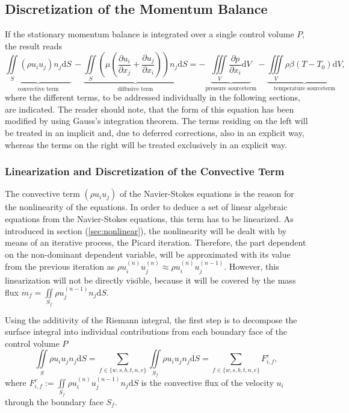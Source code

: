 \subsection{Discretization of the Momentum Balance}
\label{sec:segdiscretization}

If the stationary momentum balance is integrated over a single control volume \(P\), the result reads
\begin{equation}
  \label{eq:semidiscrete}
  \underbrace{\iint\limits_S (\rho u_i u_j)n_j \mathrm{d}S}_{\text{convective term}}
  \,- \underbrace{\iint\limits_S \left(\mu \left( \frac{\partial u_i}{\partial x_j} + \frac{\partial u_j}{\partial x_i}\right)\right)n_j \mathrm{d}S}_{\text{diffusive term}}
  = - \underbrace{\iiint\limits_V \frac{\partial p}{\partial x_i} \mathrm{d}V}_{\text{pressure sourceterm}}
  - \underbrace{\iiint\limits_V \rho \beta \left(T - T_0\right) \mathrm{d}V}_{\text{temperature sourceterm}},
\end{equation}
where the different terms, to be addressed individually in the following sections, are indicated. The reader should note, that the form of this equation has been modified by using Gauss's integration theorem. The terms residing on the left will be treated in an implicit and, due to deferred corrections, also in an explicit way, whereas the terms on the right will be treated exclusively in an explicit way.

\subsubsection{Linearization and Discretization of the Convective Term}
\label{sec:segconvective}

The convective term \(\left( \rho u_i u_j \right)\) of the Navier-Stokes equations is the reason for the nonlinearity of the equations. In order to deduce a set of linear algebraic equations from the Navier-Stokes equations, this term has to be linearized. As introduced in section (\ref{sec:nonlinear}), the nonlinearity will be dealt with by means of an iterative process, the Picard iteration. Therefore, the part dependent on the non-dominant dependent variable, will be approximated with its value from the previous iteration as \( \rho u_i^{(n)} u_j^{(n)} \approx \rho u_i^{(n)} u_j^{(n-1)} \). However, this linearization will not be directly visible, because it will be covered by the mass flux \(\textstyle \dot{m}_f = \iint\limits_{S_f} \rho u_j^{(n-1)} n_j \mathrm{d}S \). 

Using the additivity of the Riemann integral, the first step is to decompose the surface integral into individual contributions from each boundary face of the control volume \(P\)
\begin{displaymath}
  \iint\limits_S \rho u_i u_jn_j \mathrm{d}S
  = \sum_{f \in \{w,s,b,t,n,e\}} \iint\limits_{S_f}\rho u_{i} u_{j} n_{j} \mathrm{d}S
  = \sum_{f \in \{w,s,b,t,n,e\}} F_{i,f}^{c},
\end{displaymath}
where \(\textstyle F_{i,f}^c := \iint\limits_{S_f} \rho u_{i}^{(n)} u_{j}^{(n-1)} n_{j} \mathrm{d}S \) is the convective flux of the velocity \(u_i\) through the boundary face \(S_f\). 
      
